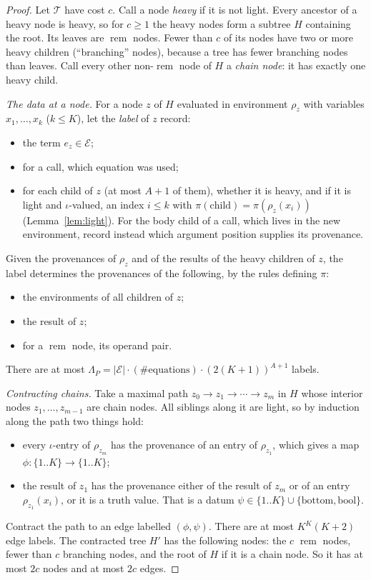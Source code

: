 \documentclass[11pt]{article}
\theoremstyle{remark}
\newcommand{\rem}{\operatorname{rem}}
\begin{document}
\begin{proof}
Let $\mathcal T$ have cost $c$. Call a node \emph{heavy} if it is not light.
Every ancestor of a heavy node is heavy, so for $c\geq1$ the heavy nodes form
a subtree $H$ containing the root. Its leaves are $\rem$ nodes. Fewer than
$c$ of its nodes have two or more heavy children (``branching'' nodes),
because a tree has fewer branching nodes than leaves. Call every other
non-$\rem$ node of $H$ a \emph{chain node}: it has exactly one heavy child.

\emph{The data at a node.} For a node $z$ of $H$ evaluated in environment
$\rho_z$ with variables $x_1,\ldots,x_k$ ($k\leq K$), let the \emph{label} of
$z$ record:
\begin{itemize}
\item the term $e_z\in\mathcal E$;
\item for a call, which equation was used;
\item for each child of $z$ (at most $A+1$ of them), whether it is heavy, and
if it is light and $\iota$-valued, an index $i\leq k$ with
$\pi(\text{child})=\pi(\rho_z(x_i))$ (Lemma~\ref{lem:light}). For the body
child of a call, which lives in the new environment, record instead which
argument position supplies its provenance.
\end{itemize}
Given the provenances of $\rho_z$ and of the results of the heavy children of
$z$, the label determines the provenances of the following, by the rules
defining $\pi$:
\begin{itemize}
\item the environments of all children of $z$;
\item the result of $z$;
\item for a $\rem$ node, its operand pair.
\end{itemize}
There are at most $\Lambda_P=|\mathcal E|\cdot(\#\text{equations})\cdot
(2(K+1))^{A+1}$ labels.

\emph{Contracting chains.} Take a maximal path $z_0\to z_1\to\cdots\to z_m$ in
$H$ whose interior nodes $z_1,\ldots,z_{m-1}$ are chain nodes. All siblings
along it are light, so by induction along the path two things hold:
\begin{itemize}
\item every $\iota$-entry of $\rho_{z_m}$ has the provenance of an entry of
$\rho_{z_1}$, which gives a map $\phi\colon\{1..K\}\to\{1..K\}$;
\item the result of $z_1$ has the provenance either of the result of $z_m$ or
of an entry $\rho_{z_1}(x_i)$, or it is a truth value. That is a datum
$\psi\in\{1..K\}\cup\{\mathrm{bottom},\mathrm{bool}\}$.
\end{itemize}
Contract the path to an edge labelled $(\phi,\psi)$. There are at most
$K^K(K+2)$ edge labels. The contracted tree $H'$ has the following nodes: the
$c$ $\rem$ nodes, fewer than $c$ branching nodes, and the root of $H$ if it
is a chain node. So it has at most $2c$ nodes and at most $2c$ edges.


\end{proof}
\end{document}

